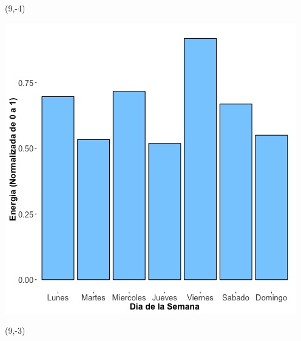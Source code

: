 \documentclass{article}\usepackage[]{graphicx}\usepackage[]{color}
\newenvironment{knitrout}{}{} %
\begin{document}
 \begin{textblock}{1}(9,-4)
\begin{minipage}{20em}
\begingroup

\endgroup
\end{minipage}
\end{textblock}


\begin{knitrout}
\color{fgcolor}
\includegraphics[scale=0.65]{figure/A28_day_of_week_plot} 
\end{knitrout}


 \begin{textblock}{1}(9,-3)
\begin{minipage}{20em}
\begingroup

\endgroup
\end{minipage}
\end{textblock}
\end{document}
